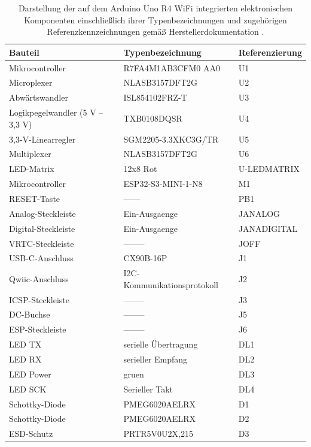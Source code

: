 \begin{table}[h!]
	\caption{Darstellung der auf dem Arduino Uno R4 WiFi integrierten elektronischen Komponenten einschließlich ihrer Typenbezeichnungen und zugehörigen Referenzkennzeichnungen gemäß Herstellerdokumentation \cite{Arduino:2026}.}
	\begin{center}
		\begin{tabular}{|l|l|l|}
			\hline
			\textbf{Bauteil} &\textbf{Typenbezeichnung} & \textbf{Referenzierung}\\
			\hline
			Mikrocontroller & R7FA4M1AB3CFM0 AA0 & U1	\\
			\hline
			Microplexer & NLASB3157DFT2G & U2	\\	
			\hline
			Abwärtswandler & ISL854102FRZ-T & U3	\\	
			\hline
			Logikpegelwandler (5 V – 3,3 V) & TXB0108DQSR  & U4	\\	
			\hline
			3,3-V-Linearregler & SGM2205-3.3XKC3G/TR & U5	\\	
			\hline
			Multiplexer & NLASB3157DFT2G & U6	\\	
			\hline
			LED-Matrix  & 12x8 Rot & U-LEDMATRIX\\	
			\hline
			Mikrocontroller & ESP32-S3-MINI-1-N8 & M1\\	
			\hline
			RESET-Taste & ------ & PB1\\	
			\hline
			Analog-Steckleiste & Ein-Ausgaenge & JANALOG\\	
			\hline
			Digital-Steckleiste & Ein-Ausgaenge & JANADIGITAL\\
			\hline
			VRTC-Steckleiste & -------- & JOFF	\\	
			\hline
			USB-C-Anschluss & CX90B-16P & J1	\\	
			\hline
			Qwiic-Anschluss & I2C-Kommunikationsprotokoll & J2	\\	
			\hline
			ICSP-Steckleiste  & -------- & J3	\\	
			\hline
			DC-Buchse & -------- & J5	\\	
			\hline
			ESP-Steckleiste & -------- & J6	\\	
			\hline
			LED TX & serielle Übertragung & DL1	\\	
			\hline
			LED RX & serieller Empfang & DL2	\\	
			\hline
			LED Power & gruen & DL3	\\	
			\hline
			LED SCK & Serieller Takt & DL4	\\	
			\hline
			Schottky-Diode & PMEG6020AELRX  & D1	\\	
			\hline
			Schottky-Diode & PMEG6020AELRX  & D2	\\
			\hline
			ESD-Schutz & PRTR5V0U2X,215 & D3	\\		
			\hline
		\end{tabular}
		\label{VerbaulisteR4}
	\end{center}
\end{table} 


